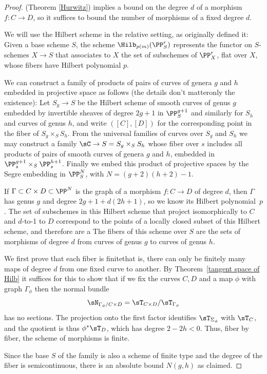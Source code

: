  \begin{proof}
%
(Theorem \ref{Hurwitz}) implies a bound on the
degree $d$ of a morphism $f : C \to D$, so it suffices to
 bound the number of morphisms of a fixed degree $d$.

 We will use the Hilbert scheme in the relative setting, as
%
 originally defined it: Given a base scheme $S$,
the scheme $\Hilb_{p(m)}(\PP_{S}^{r})$ represents the functor on
$S$-schemes $X\to S$ that associates to
$X$ the set of subschemes of $\PP_{X}^{r}$, flat over $X$, whose fibers
have Hilbert polynomial $p$.

We can construct a family of products of pairs of curves of genera $g$
and $h$ embedded in projective space as follows
(the details don't matter\emdash only the existence):
Let $S_{g}\to S$ be the Hilbert scheme of smooth curves of genus $g$
embedded by invertible sheaves of degree $2g+1$
in $\PP^{g+1}_{S}$
and similarly for $S_{h}$ and curves of genus $h$, and write $([C],[D])$
for the corresponding point in the fiber
of $S_{g}\times_{S}S_{h}$. From the universal families of curves over
$S_{g}$ and
$S_{h}$ we may construct a family $\sC \to S= S_{g}\times_{S} S_{h}$
whose fiber over $s$ includes all products of
pairs of smooth curves of genera $g$ and $h$, embedded in
$\PP_{s}^{g+1}\times_{S}\PP_{s}^{h+1}$. Finally we embed
this product of projective spaces by the Segre embedding in $\PP_{S}^{N}$,
with $N = (g+2)(h+2)-1$.
{\meshing[-3pt]\par}

If $\Gamma \subset C \times D \subset \PP^N$ is the graph of a morphism $f
: C \to D$ of degree $d$, then $\Gamma$ has genus $g$ and degree $2g+1 +
d(2h+1)$, so we know its Hilbert polynomial~$p$. The set of
subschemes in this Hilbert scheme that project isomorphically to $C$
and $d$-to-1 to $D$ correspond to the
points of a  locally closed
subset of
this Hilbert scheme, and therefore
%
are a
%
The fibers
of this scheme over $S$ are the sets of morphisms of degree $d$ from
curves of genus $g$ to curves of genus $h$.

We first prove that each fiber is finite\emdash that is, there can only
be finitely many maps of degree $d$ from
one fixed curve to another.  By Theorem~\ref{tangent space of Hilb} it
suffices for this to show that if we fix the curves $C,D$ and a map $\phi$
with graph $\Gamma_{\phi}$
then the normal bundle
$$
\sN_{\Gamma_{\phi}/C\times D} = \sT_{C\times D}/\sT_{\Gamma_{\phi}}
$$
has no sections. The projection onto the first factor identifies
$\sT_{\Sigma_{\phi}}$ with $\sT_{C}$,
and the quotient is thus $\phi^{*} \sT_{D}$, which has degree
$2-2h<0$. Thus, fiber by fiber,
the scheme of morphisms is finite.

Since the base $S$ of the family is also a scheme of finite type and
%
the degree of the fiber is semicontinuous,
there is an absolute bound $N(g,h)$ as claimed.
 \end{proof}


